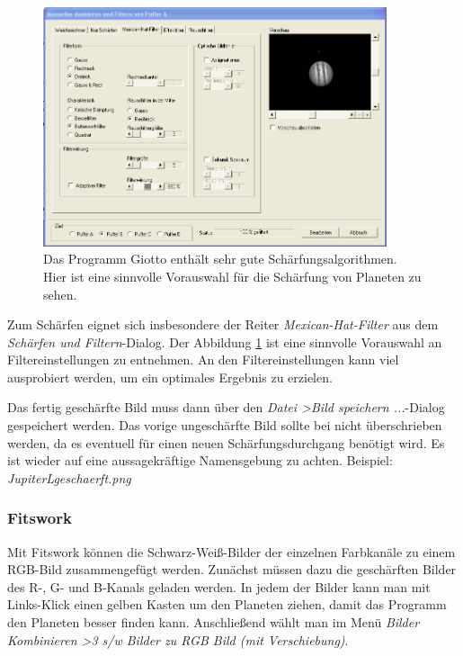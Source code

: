 \documentclass[10pt,a4paper,titlepage]{article}
\begin{document}
\begin{figure}[h!]
  \centering
    \includegraphics[width=0.9\textwidth]{Giotto-Filter}
  \caption{Das Programm Giotto enthält sehr gute Schärfungsalgorithmen. Hier ist eine sinnvolle Vorauswahl für die Schärfung von Planeten zu sehen.}
  \label{fig:giotto}
\end{figure}

Zum Schärfen eignet sich insbesondere der Reiter \textit{Mexican-Hat-Filter} aus dem \textit{Schärfen und Filtern}-Dialog. Der Abbildung \ref{fig:giotto} ist eine sinnvolle Vorauswahl an Filtereinstellungen zu entnehmen. An den Filtereinstellungen kann viel ausprobiert werden, um ein optimales Ergebnis zu erzielen.

Das fertig geschärfte Bild muss dann über den \textit{Datei \textgreater Bild speichern ...}-Dialog gespeichert werden. Das vorige ungeschärfte Bild sollte bei nicht überschrieben werden, da es eventuell für einen neuen Schärfungsdurchgang benötigt wird. Es ist wieder auf eine aussagekräftige Namensgebung zu achten. Beispiel: \textit{Jupiter\textunderscore L\textunderscore geschaerft.png}

\subsubsection{Fitswork}

Mit Fitswork können die Schwarz-Weiß-Bilder der einzelnen Farbkanäle zu einem RGB-Bild zusammengefügt werden. Zunächst müssen dazu die geschärften Bilder des R-, G- und B-Kanals geladen werden. In jedem der Bilder kann man mit Links-Klick einen gelben Kasten um den Planeten ziehen, damit das Programm den Planeten besser finden kann. Anschließend wählt man im Menü \textit{Bilder Kombinieren \textgreater 3 s/w Bilder zu RGB Bild (mit Verschiebung)}. 
\end{document}
